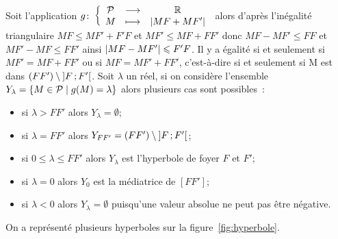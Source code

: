 Soit l'application \(g\colon \left\{\begin{array}{ccc} \mathcal{P} & \longrightarrow &\mathbb{R}\\ M & \longmapsto & \left\lvert MF+MF'\right\rvert \end{array} \right.\) alors d'après 
l'inégalité triangulaire \(MF \leqslant MF'+F'F\) et \(MF'\leqslant MF+FF'\) 
donc \(MF-MF'\leqslant FF\) et \(MF'-MF\leqslant FF'\) ainsi 
\(\left\lvert MF-MF'\right\rvert\leqslant F'F\). Il y a égalité si et seulement si 
\(MF'=MF+FF'\) ou si \(MF=MF'+FF'\), c'est-à-dire si et seulement si M est 
dans \((FF') \setminus \left] F \, ;  F' \right[\). Soit \(\lambda\) un réel, si on 
considère l'ensemble \(Y_{\lambda}=\left\{M \in \mathcal{P}\mathrel{}\middle|\mathrel{}g(M)=\lambda\right\}\) alors 
plusieurs cas sont possibles~:
\begin{itemize}
  \item si \(\lambda>FF'\) alors \(Y_{\lambda}=\emptyset\);
  \item si \(\lambda=FF'\) alors \(Y_{FF'}=(FF') \setminus 
    \left] F \, ;  F' \right[\);
  \item si \(0\leqslant\lambda\leqslant FF'\) alors \(Y_{\lambda}\) est 
    l'hyperbole de foyer \(F\) et \(F'\);
  \item si \(\lambda=0\) alors \(Y_{0}\) est la médiatrice de \([FF']\);
  \item si \(\lambda<0\) alors \(Y_{\lambda}=\emptyset\) puisqu'une valeur 
    absolue ne peut pas être négative.
\end{itemize}

On a représenté plusieurs hyperboles sur la figure~\ref{fig:hyperbole}.

